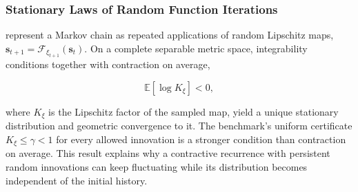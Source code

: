 \subsubsection{Stationary Laws of Random Function Iterations}

\citet{diaconis1999iterated} represent a Markov chain as repeated applications
of random Lipschitz maps,
$\mathbf{s}_{t+1}=\mathcal F_{\xi_{t+1}}(\mathbf{s}_t)$. On a complete
separable metric space, integrability conditions together with contraction on
average,

\begin{equation}
    \mathbb E[\log K_{\xi}]<0,
\end{equation}

where $K_{\xi}$ is the Lipschitz factor of the sampled map, yield a unique
stationary distribution and geometric convergence to it. The benchmark's
uniform certificate $K_{\xi}\le\gamma<1$ for every allowed innovation is a
stronger condition than contraction on average. This result explains why a
contractive recurrence with persistent random innovations can keep fluctuating
while its distribution becomes independent of the initial history.
